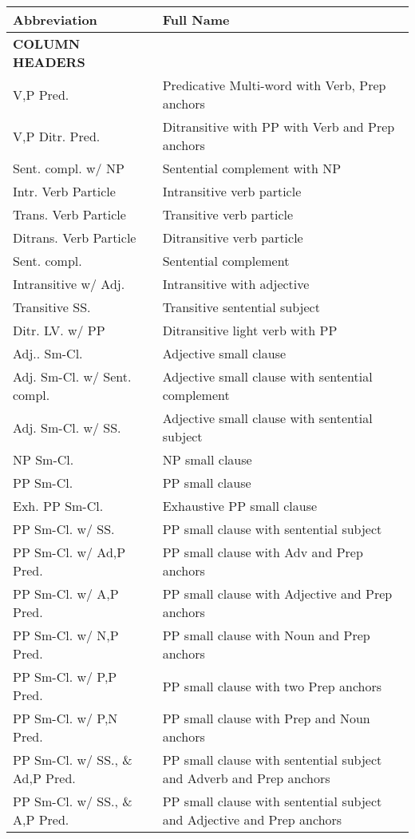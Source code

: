 \footnotesize
\begin{tabular}{ll}
Abbreviation&Full Name\\
\hline
{\bf COLUMN HEADERS} &\\
\hline
V,P Pred. & Predicative Multi-word with Verb, Prep anchors \\
V,P Ditr. Pred. & Ditransitive with PP with Verb and Prep anchors\\
Sent. compl. w/ NP & Sentential complement with NP \\
Intr. Verb Particle & Intransitive verb particle \\
Trans. Verb Particle & Transitive verb particle \\
Ditrans. Verb Particle & Ditransitive verb particle \\
Sent. compl. & Sentential complement \\
Intransitive w/ Adj. & Intransitive with adjective \\
Transitive SS. & Transitive sentential subject \\
Ditr. LV. w/ PP & Ditransitive light verb with PP \\
Adj.. Sm-Cl. & Adjective small clause \\
Adj. Sm-Cl. w/ Sent. compl. & Adjective small clause with sentential
complement \\
Adj. Sm-Cl. w/ SS. & Adjective small clause with sentential
subject \\
NP Sm-Cl. & NP small clause \\
PP Sm-Cl. & PP small clause \\
Exh. PP Sm-Cl. & Exhaustive PP small clause \\
PP Sm-Cl. w/ SS. & PP small clause with sentential subject \\
PP Sm-Cl. w/ Ad,P Pred. & PP small clause with Adv and Prep anchors \\
PP Sm-Cl. w/ A,P Pred. & PP small clause with Adjective and Prep anchors \\
PP Sm-Cl. w/ N,P Pred. & PP small clause with Noun and Prep anchors \\
PP Sm-Cl. w/ P,P Pred. & PP small clause with two Prep anchors \\
PP Sm-Cl. w/ P,N Pred. & PP small clause with Prep and Noun anchors \\
PP Sm-Cl. w/ SS., \& Ad,P Pred. & PP small clause with sentential subject
and Adverb and Prep anchors \\
PP Sm-Cl. w/ SS., \& A,P Pred. & PP small clause with sentential subject
and Adjective and Prep anchors \\

\end{tabular}
